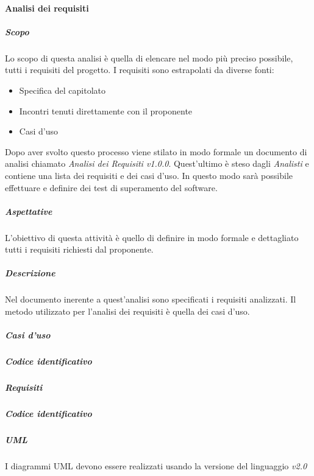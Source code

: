 		\paragraph{Analisi dei requisiti}
			\subparagraph{Scopo}
			Lo scopo di questa analisi è quella di elencare nel modo più preciso possibile, tutti i requisiti del progetto. 
			I requisiti sono estrapolati da diverse fonti:
				\begin{itemize}
				\item Specifica del capitolato 
				\item Incontri tenuti direttamente con il proponente
				\item Casi d'uso
			\end{itemize}
		    Dopo aver svolto questo processo viene stilato in modo formale un documento di analisi chiamato \textit{Analisi dei Requisiti v1.0.0}.
		    Quest'ultimo è steso dagli \emph{Analisti} e contiene una lista dei requisiti e dei casi d'uso.
		    In questo modo sarà possibile effettuare e definire dei test di superamento del software. 
			\subparagraph{Aspettative}
			L'obiettivo di questa attività è quello di definire in modo formale e dettagliato tutti i requisiti richiesti dal proponente.
			\subparagraph{Descrizione}
			Nel documento inerente a quest'analisi sono specificati i requisiti analizzati.
			Il metodo utilizzato per l'analisi dei requisiti è quella dei casi d'uso.
			\subparagraph{Casi d'uso}
			\subparagraph{Codice identificativo}
			\subparagraph{Requisiti}
			\subparagraph{Codice identificativo}
			\subparagraph{UML}
			I diagrammi UML devono essere realizzati usando la versione del linguaggio \textit{v2.0}
			
			

